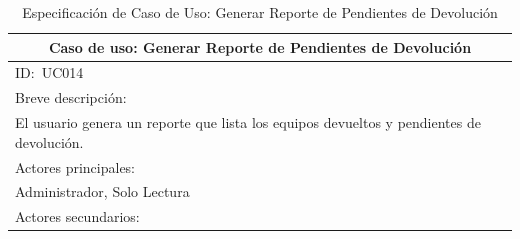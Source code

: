\documentclass[stu, 12pt, letterpaper, donotrepeattitle, floatsintext, natbib]{apa7}
\begin{document}
\begin{longtable}{@{} p{16.5cm} @{}}
    \caption{Especificación de Caso de Uso: Generar Reporte de Pendientes de Devolución}\label{tab:UC014}                                                                                                                                                                          \\ \toprule
    \multicolumn{1}{c}{Caso de uso: Generar Reporte de Pendientes de Devolución}                                                                                                                                                                                                   \\ \midrule
    ID:~UC014                                                                                                                                                                                                                                                                      \\ \midrule
    Breve descripción:                                                                                                                                                                                                                                                             \\
    El usuario genera un reporte que lista los equipos devueltos y pendientes de devolución.                                                                                                                                                                                       \\ \midrule
    Actores principales:                                                                                                                                                                                                                                                           \\
    Administrador, Solo Lectura                                                                                                                                                                                                                                                    \\ \midrule
    Actores secundarios:                                                                                                                                                                                                                                                           \\

\end{longtable}
\end{document}
